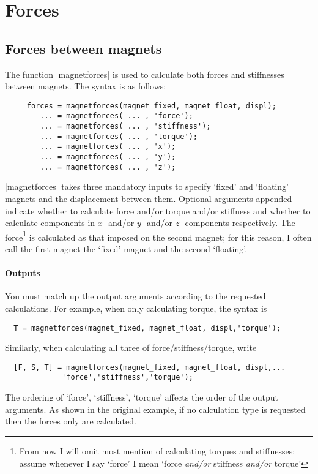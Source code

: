 \documentclass{article}
\begin{document}
\section{Forces}

\subsection{Forces between magnets}

The function |magnetforces| is used to calculate both forces and stiffnesses
between magnets. The syntax is as follows:

\begin{verbatim}
     forces = magnetforces(magnet_fixed, magnet_float, displ);
        ... = magnetforces( ... , 'force');
        ... = magnetforces( ... , 'stiffness');
        ... = magnetforces( ... , 'torque');
        ... = magnetforces( ... , 'x');
        ... = magnetforces( ... , 'y');
        ... = magnetforces( ... , 'z');
\end{verbatim}

|magnetforces| takes three mandatory inputs to specify `fixed' and `floating' magnets and the displacement between them.
Optional arguments appended indicate whether to calculate force and/or torque and/or stiffness and whether to calculate components in $x$- and/or $y$- and/or $z$- components respectively.
The force\footnote{From now I will omit most mention of calculating torques and stiffnesses; assume whenever I say `force' I mean `force \emph{and/or} stiffness \emph{and/or} torque'} is calculated as that imposed on the second magnet; for this reason, I often call the first magnet the `fixed' magnet and the second `floating'.

\paragraph{Outputs}
You must match up the output arguments according to the requested calculations.
For example, when only calculating torque, the syntax is
\begin{verbatim}
  T = magnetforces(magnet_fixed, magnet_float, displ,'torque');
\end{verbatim}
Similarly, when calculating all three of force/stiffness/torque, write
\begin{verbatim}
  [F, S, T] = magnetforces(magnet_fixed, magnet_float, displ,...
	         'force','stiffness','torque');
\end{verbatim}
The ordering of `force', `stiffness', `torque' affects the order of the output
arguments.
As shown in the original example, if no calculation type is requested then
the forces only are calculated.
\end{document}
